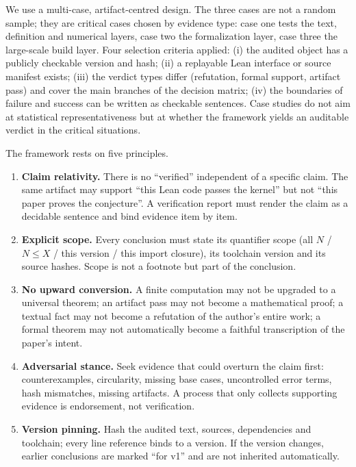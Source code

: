 \documentclass[11pt,a4paper]{article}
\theoremstyle{plain}
\theoremstyle{definition}
\begin{document}
We use a multi-case, artifact-centred design. The three cases are not a random sample; they are critical cases chosen by evidence type: case one tests the text, definition and numerical layers, case two the formalization layer, case three the large-scale build layer. Four selection criteria applied: (i) the audited object has a publicly checkable version and hash; (ii) a replayable Lean interface or source manifest exists; (iii) the verdict types differ (refutation, formal support, artifact pass) and cover the main branches of the decision matrix; (iv) the boundaries of failure and success can be written as checkable sentences. Case studies do not aim at statistical representativeness but at whether the framework yields an auditable verdict in the critical situations.

The framework rests on five principles.

\begin{enumerate}
\item \textbf{Claim relativity.} There is no ``verified'' independent of a specific claim. The same artifact may support ``this Lean code passes the kernel'' but not ``this paper proves the conjecture''. A verification report must render the claim as a decidable sentence and bind evidence item by item.
\item \textbf{Explicit scope.} Every conclusion must state its quantifier scope (all $N$ / $N\le X$ / this version / this import closure), its toolchain version and its source hashes. Scope is not a footnote but part of the conclusion.
\item \textbf{No upward conversion.} A finite computation may not be upgraded to a universal theorem; an artifact pass may not become a mathematical proof; a textual fact may not become a refutation of the author's entire work; a formal theorem may not automatically become a faithful transcription of the paper's intent.
\item \textbf{Adversarial stance.} Seek evidence that could overturn the claim first: counterexamples, circularity, missing base cases, uncontrolled error terms, hash mismatches, missing artifacts. A process that only collects supporting evidence is endorsement, not verification.
\item \textbf{Version pinning.} Hash the audited text, sources, dependencies and toolchain; every line reference binds to a version. If the version changes, earlier conclusions are marked ``for v1'' and are not inherited automatically.
\end{enumerate}
\end{document}
